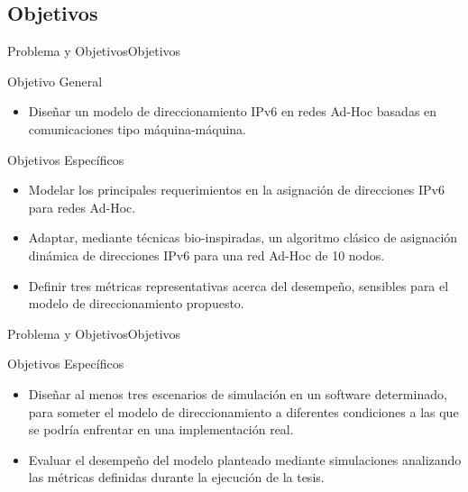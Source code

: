 \subsection{Objetivos}
\begin{frame}{Problema y Objetivos}{Objetivos}
  \begin{block}{Objetivo General}
    \begin{itemize}    
    \item Diseñar un modelo de direccionamiento IPv6 en redes Ad-Hoc basadas en comunicaciones tipo máquina-máquina. 
    \end{itemize}
  \end{block}
  \begin{block}{Objetivos Específicos}
    \begin{itemize}
    \justifying
        \item Modelar los principales requerimientos en la asignación de direcciones IPv6 para redes Ad-Hoc.
        \item Adaptar, mediante técnicas bio-inspiradas, un algoritmo clásico de asignación dinámica de direcciones IPv6 para una red Ad-Hoc de 10 nodos. 
        \item Definir tres métricas representativas acerca del desempeño, sensibles para el modelo de direccionamiento propuesto.
    \end{itemize}
  \end{block}
\end{frame}
\begin{frame}{Problema y Objetivos}{Objetivos} 
  \begin{block}{Objetivos Específicos}
    \begin{itemize}
    \justifying
        \item Diseñar al menos tres escenarios de simulación en un software determinado, para someter el modelo de direccionamiento a diferentes condiciones a las que se podría enfrentar en una implementación real.
        \item Evaluar el desempeño del modelo planteado mediante simulaciones analizando las métricas definidas durante la ejecución de la tesis.
    \end{itemize}
  \end{block}
\end{frame}
